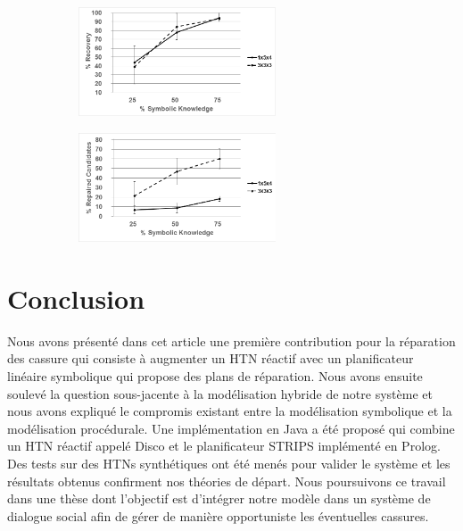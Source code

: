 \documentclass[a4paper,twoside,french]{article}
\begin{document}
		\begin{figure}[t]
			\centering
			\begin{subfigure}{2.3in}
				\centerline{\includegraphics[width=2.3in]{figs/recovery}}
				\vskip 8pt 
			\end{subfigure}
			\hfill
			\begin{subfigure}{2.3in}
				\centerline{\includegraphics[width=2.3in]{figs/candidates}}
				\vskip 8pt 
			\end{subfigure}
			\vskip 6pt
		\end{figure}
\section{Conclusion}
Nous avons présenté dans cet article une première contribution pour la réparation des cassure qui consiste à augmenter un HTN réactif avec un planificateur linéaire symbolique qui propose des plans de réparation. Nous avons ensuite soulevé la question sous-jacente à la modélisation hybride de notre système et nous avons expliqué le compromis existant entre la modélisation symbolique et la modélisation procédurale. Une implémentation en Java a été proposé qui combine un HTN réactif appelé Disco et le planificateur STRIPS implémenté en Prolog. Des tests sur des HTNs synthétiques ont été menés pour valider le système et les résultats obtenus confirment nos théories de départ. Nous poursuivons ce travail dans une thèse dont l'objectif est d'intégrer notre modèle dans un système de dialogue social afin de gérer de manière opportuniste les éventuelles cassures.
		\vskip 4pt
		
							
				
\end{document}
